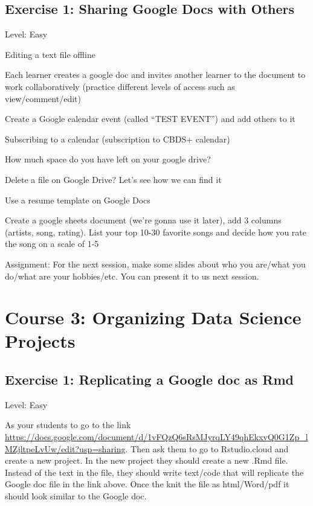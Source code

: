 \documentclass[]{book}
\begin{document}
\hypertarget{exercise-1-sharing-google-docs-with-others}{%
\section*{Exercise 1: Sharing Google Docs with Others}\label{exercise-1-sharing-google-docs-with-others}}

Level: Easy

Editing a text file offline

Each learner creates a google doc and invites another learner to the document to work collaboratively (practice different levels of access such as view/comment/edit)

Create a Google calendar event (called ``TEST EVENT'') and add others to it

Subscribing to a calendar (subscription to CBDS+ calendar)

How much space do you have left on your google drive?

Delete a file on Google Drive? Let's see how we can find it

Use a resume template on Google Docs

Create a google sheets document (we're gonna use it later), add 3 columns (artists, song, rating). List your top 10-30 favorite songs and decide how you rate the song on a scale of 1-5

Assignment: For the next session, make some slides about who you are/what you do/what are your hobbies/etc. You can present it to us next session.

\hypertarget{organizing}{%
\chapter*{Course 3: Organizing Data Science Projects}\label{organizing}}

\hypertarget{exercise-1-replicating-a-google-doc-as-rmd}{%
\section*{Exercise 1: Replicating a Google doc as Rmd}\label{exercise-1-replicating-a-google-doc-as-rmd}}

Level: Easy

As your students to go to the link \url{https://docs.google.com/document/d/1vFQzQ6sRsMJyrqLY49qhEkxvQ0G1Zp_lMZjltpeLvUw/edit?usp=sharing}. Then ask them to go to Rstudio.cloud and create a new project. In the new project they should create a new .Rmd file. Instead of the text in the file, they should write text/code that will replicate the Google doc file in the link above. Once the knit the file as html/Word/pdf it should look similar to the Google doc.
\end{document}
